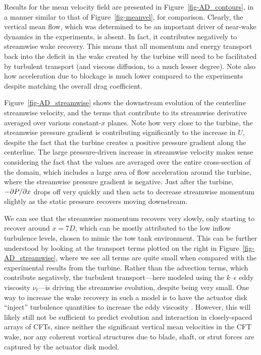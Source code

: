 Results for the mean velocity field are presented in
Figure~\ref{fig-AD_contours}, in a manner similar to that of
Figure~\ref{fig-meanvel}, for comparison. Clearly, the vertical mean flow, which
was determined to be an important driver of near-wake dynamics in the
experiments, is absent. In fact, it contributes negatively to streamwise wake
recovery. This means that all momentum and energy transport back into the
deficit in the wake created by the turbine will need to be facilitated by
turbulent transport (and viscous diffusion, to a much lesser degree). Note also
how acceleration due to blockage is much lower compared to the experiments
despite matching the overall drag coefficient.

Figure~\ref{fig-AD_streamwise} shows the downstream evolution of the centerline
streamwise velocity, and the terms that contribute to its streamwise derivative
averaged over various constant-$x$ planes. Note how very close to the turbine,
the streamwise pressure gradient is contributing significantly to the increase
in $U$, despite the fact that the turbine creates a positive pressure gradient
along the centerline. The large pressure-driven increase in streamwise velocity
makes sense considering the fact that the values are averaged over the entire
cross-section of the domain, which includes a large area of flow acceleration
around the turbine, where the streamwise pressure gradient is negative. Just
after the turbine, $-\partial P / \partial x$ drops off very quickly and then acts to
decrease streamwise momentum slightly as the static pressure recovers moving
downstream.

We can see that the streamwise momentum recovers very slowly, only starting to
recover around $x=7D$, which can be mostly attributed to the low inflow
turbulence levels, chosen to mimic the tow tank environment. This can be further
understood by looking at the transport terms plotted on the right in
Figure~\ref{fig-AD_streamwise}, where we see all terms are quite small when
compared with the experimental results from the turbine. Rather than the
advection terms, which contribute negatively, the turbulent transport---here
modeled using the $k$--$\epsilon$ eddy viscosity $\nu_t$---is driving the
streamwise evolution, despite being very small. One way to increase the wake
recovery in such a model is to have the actuator disk ``inject'' turbulence
quantities to increase the eddy viscosity \cite{James2011, Nelson2013}. However,
this will likely still not be sufficient to predict evolution and interaction in
closely-spaced arrays of CFTs, since neither the significant vertical mean 
velocities in the CFT wake, nor any coherent vortical structures 
due to blade, shaft, or strut forces are captured by the actuator disk model.

